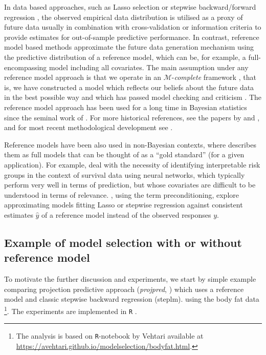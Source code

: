\documentclass[american,]{article}
\let\rmarkdownfootnote\footnote%
\def\footnote{\protect\rmarkdownfootnote}
\theoremstyle{definition}
\begin{document}
In data based approaches, such as Lasso selection
\citep{tibshirani1996regression} or stepwise backward/forward
regression \citep{venables2013modern,harrell2015regression}, the
observed empirical data distribution is utilised as a proxy of future
data usually in combination with cross-validation or information
criteria to provide estimates for out-of-sample predictive
performance.  In contrast, reference model based methods approximate
the future data generation mechanism using the predictive distribution
of a reference model, which can be, for example, a full-encompassing
model including all covariates.  The main assumption under any
reference model approach is that we operate in an
$\mathcal{M}$-\textit{complete} framework
\citep{book:bernardo_smith,vehtari2012survey}, that is, we have
constructed a model which reflects our beliefs about
the future data in the best possible way and which has passed model checking and criticism
\citep[see, e.g.][]{gelman2013bayesian}.  The reference model approach
has been used for a long time in Bayesian statistics since the seminal
work of \citet{paper:reference_lindley}. For more historical
references, see the papers by \citet{vehtari2012survey} and
\citet{paper:model_selection}, and for most recent methodological
development see \citet{paper:projpred}.

Reference models have been also used in non-Bayesian contexts, where
\cite{harrell2015regression} describes them as full models that can be
thought of as a ``gold standard'' (for a given application).  For
example, \cite{faraggi2001understanding} deal with the necessity of
identifying interpretable risk groups in the context of survival data
using neural networks, which typically perform very well in terms of
prediction, but whose covariates are difficult to be understood in
terms of relevance.  \cite{paul2008preconditioning}, using the term
preconditioning, explore approximating models fitting Lasso or
stepwise regression against consistent estimates $\hat{y}$ of a
reference model instead of the observed responses $y$.

\subsection{Example of model selection with or without reference model}

To motivate the further discussion and experiments, we start by simple
example comparing projection predictive approach (\emph{projpred},
\citet{paper:projpred}) which uses a reference model and classic
stepwise backward regression (steplm).  using the body fat data
\citep{johnson1996fitting}\footnote{The analysis is based on
  \texttt{R}-notebook by Vehtari available at
  \url{https://avehtari.github.io/modelselection/bodyfat.html}.}.  The
experiments are implemented in \texttt{R} \citep{Rcore2018}.
\end{document}
